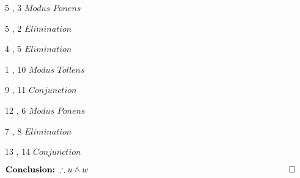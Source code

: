 \documentclass[12pt]{article}
\begin{document}
\begin{minipage}{.35\textwidth}
\vspace{7\baselineskip}
5 , 3 \hspace{.5cm} $\textit{Modus Ponens}$

5 , 2 \hspace{.5cm} $\textit{Elimination}$

4 , 5 \hspace{.5cm} $\textit{Elimination}$

1 , 10 \hspace{.3cm} $\textit{Modus Tollens}$

9 , 11 \hspace{.3cm} $\textit{Conjunction}$

12 , 6 \hspace{.3cm} $\textit{Modus Ponens}$

7 , 8 \hspace{.5cm} $\textit{Elimination}$

13 , 14 \hspace{.1cm} $\textit{Conjunction}$

\end{minipage}%

\bigskip
\bigskip
$\textbf{Conclusion: $\therefore u \land w$ \hspace{8cm} $\square$}$
\end{document}

